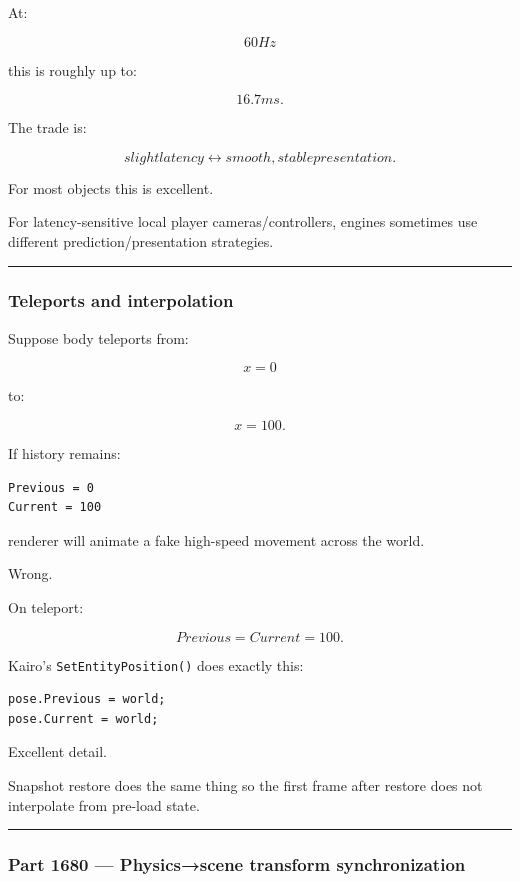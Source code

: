 At:

\[
60Hz
\]

this is roughly up to:

\[
16.7ms.
\]

The trade is:

\[
\boxed{
slight latency
\leftrightarrow
smooth, stable presentation.
}
\]

For most objects this is excellent.

For latency-sensitive local player cameras/controllers, engines sometimes use different prediction/presentation strategies.

\begin{center}\rule{0.5\linewidth}{0.5pt}\end{center}

\subsubsection{Teleports and interpolation}\label{teleports-and-interpolation}

Suppose body teleports from:

\[
x=0
\]

to:

\[
x=100.
\]

If history remains:

\begin{verbatim}
Previous = 0
Current = 100
\end{verbatim}

renderer will animate a fake high-speed movement across the world.

Wrong.

On teleport:

\[
Previous=Current=100.
\]

Kairo's \texttt{SetEntityPosition()} does exactly this:

\begin{verbatim}
pose.Previous = world;
pose.Current = world;
\end{verbatim}

Excellent detail.

Snapshot restore does the same thing so the first frame after restore does not interpolate from pre-load state.

\begin{center}\rule{0.5\linewidth}{0.5pt}\end{center}

\subsubsection{Part 1680 --- Physics→scene transform synchronization}\label{part-1680-physicsscene-transform-synchronization}

